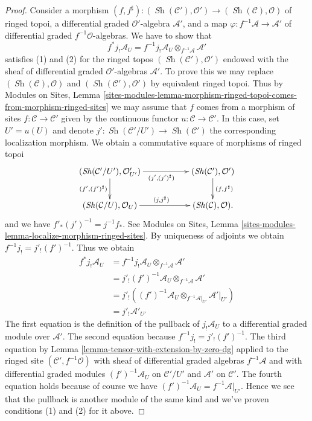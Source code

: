 \documentclass[10pt,a4paper]{amsart}
\theoremstyle{plain}
\theoremstyle{definition}
\theoremstyle{remark}
\numberwithin{equation}{subsection}
\def\Sh{\mathop{\mathit{Sh}}\nolimits}
\begin{document}
\begin{proof}
\medskip\noindent
Consider a morphism $(f, f^\sharp) : (\Sh(\mathcal{C}'), \mathcal{O}')
\to (\Sh(\mathcal{C}), \mathcal{O})$
of ringed topoi, a differential graded $\mathcal{O}'$-algebra
$\mathcal{A}'$, and a map $\varphi : f^{-1}\mathcal{A} \to \mathcal{A}'$
of differential graded $f^{-1}\mathcal{O}$-algebras.
We have to show that
$$
f^*j_!\mathcal{A}_U =
f^{-1}j_!\mathcal{A}_U \otimes_{f^{-1}\mathcal{A}} \mathcal{A}'
$$
satisfies (1) and (2) for the ringed topos
$(\Sh(\mathcal{C}'), \mathcal{O}')$ endowed with the
sheaf of differential graded $\mathcal{O}'$-algebras
$\mathcal{A}'$. To prove this we may replace
$(\Sh(\mathcal{C}), \mathcal{O})$ and
$(\Sh(\mathcal{C}'), \mathcal{O}')$ by equivalent ringed topoi.
Thus by
Modules on Sites, Lemma
\ref{sites-modules-lemma-morphism-ringed-topoi-comes-from-morphism-ringed-sites}
we may assume that $f$ comes from a morphism of sites
$f : \mathcal{C} \to \mathcal{C}'$ given by the continuous
functor $u : \mathcal{C} \to \mathcal{C}'$.
In this case, set $U' = u(U)$ and denote
$j' : \Sh(\mathcal{C}'/U') \to \Sh(\mathcal{C}')$ the
corresponding localization morphism.
We obtain a commutative square of morphisms of ringed topoi
$$
\xymatrix{
(\Sh(\mathcal{C}'/U'), \mathcal{O}'_{U'})
\ar[rr]_{(j', (j')^\sharp)} \ar[d]_{(f', (f')^\sharp)} & &
(\Sh(\mathcal{C}'), \mathcal{O}')
\ar[d]^{(f, f^\sharp)} \\
(\Sh(\mathcal{C}/U), \mathcal{O}_U)
\ar[rr]^{(j, j^\sharp)} & &
(\Sh(\mathcal{C}), \mathcal{O}).
}
$$
and we have $f'_*(j')^{-1} = j^{-1}f_*$. See
Modules on Sites, Lemma
\ref{sites-modules-lemma-localize-morphism-ringed-sites}.
By uniqueness of adjoints we obtain
$f^{-1}j_! = j'_!(f')^{-1}$. Thus we obtain
\begin{align*}
f^*j_!\mathcal{A}_U
& =
f^{-1}j_!\mathcal{A}_U \otimes_{f^{-1}\mathcal{A}} \mathcal{A}' \\
& =
j'_!(f')^{-1}\mathcal{A}_U \otimes_{f^{-1}\mathcal{A}} \mathcal{A}' \\
& =
j'_!\left(
(f')^{-1}\mathcal{A}_U \otimes_{f^{-1}\mathcal{A}|_{U'}}
\mathcal{A}'|_{U'}\right) \\
& =
j'_!\mathcal{A}'_{U'}
\end{align*}
The first equation is the definition of the pullback of $j_!\mathcal{A}_U$
to a differential graded module over $\mathcal{A}'$.
The second equation because $f^{-1}j_! = j'_!(f')^{-1}$.
The third equation by Lemma \ref{lemma-tensor-with-extension-by-zero-dg}
applied to the ringed site $(\mathcal{C}', f^{-1}\mathcal{O})$ with
sheaf of differential graded algebras $f^{-1}\mathcal{A}$ and with
differential graded modules $(f')^{-1}\mathcal{A}_U$ on $\mathcal{C}'/U'$
and $\mathcal{A}'$ on $\mathcal{C}'$.
The fourth equation holds because of course we have
$(f')^{-1}\mathcal{A}_U = f^{-1}\mathcal{A}|_{U'}$.
Hence we see that the pullback is another module of the
same kind and we've proven conditions (1) and (2) for it above.
\end{proof}
\end{document}
